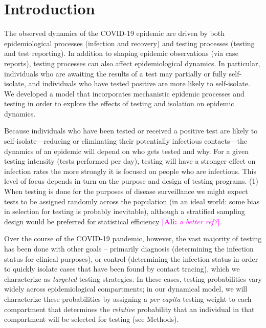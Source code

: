 \documentclass[12pt]{article}
\newcommand{\percap}{\emph{per capita}\xspace}
\newcommand{\covid}{COVID-19\xspace}
\newcommand{\comment}{\showcomment}
\newcommand{\showcomment}[3]{\textcolor{#1}{\textbf{[#2: }\textsl{#3}\textbf{]}}}
\newcommand{\ali}[1]{\comment{magenta}{Ali}{#1}}
\theoremstyle{definition} %
\begin{document}
\section{Introduction}

The observed dynamics of the \covid epidemic are driven by both epidemiological processes (infection and recovery) and testing processes (testing and test reporting). In addition to shaping epidemic observations (via case reports), testing processes can also affect epidemiological dynamics. In particular, individuals who are awaiting the results of a test may partially or fully self-isolate, and individuals who have tested positive are more likely to self-isolate. We developed a model that incorporates mechanistic epidemic processes and testing in order to explore the effects of testing and isolation on epidemic dynamics.

Because individuals who have been tested or received a positive test are likely to self-isolate---reducing or eliminating  their potentially infectious contacts---the dynamics of an epidemic will depend on who gets tested and
why. For a given testing intensity (tests performed per day), testing will have a stronger effect on infection rates
the more strongly it is focused on people who are infectious.
This level of focus depends in turn on the purpose and design of testing programs.
(1) When testing is done for the purposes of disease surveillance \citep{foddai2020base}
we might expect tests to be assigned randomly across the population (in an ideal world: some bias in selection for testing is probably inevitable), although a stratified sampling design would be preferred for statistical efficiency \citep{graubard1996modelling} \ali{a better ref?}.

Over the course of the \covid pandemic, however, the vast majority of testing has been done with other goals --
primarily diagnosis (determining the infection status for clinical purposes), or control (determining the infection status in order to quickly isolate cases that have been found by contact tracing), which we characterize as \emph{targeted} testing strategies.
In these cases, testing probabilities vary widely across epidemiological compartments; in our dynamical model, we will characterize these probabilities by assigning a \percap testing weight to each compartment that determines the \emph{relative} probability that an individual in that compartment will be selected for testing (see Methods). 
\end{document}
